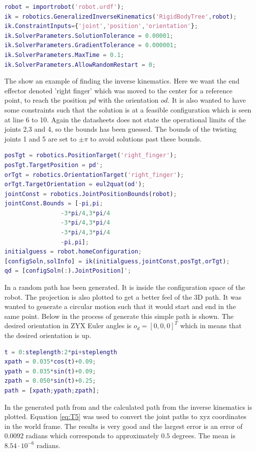 \begin{lstlisting}[caption={MATLAB code of creating a invrerse kinematics},label={lst:robotinit},language=Matlab]
robot = importrobot('robot.urdf');
ik = robotics.GeneralizedInverseKinematics('RigidBodyTree',robot);
ik.ConstraintInputs={'joint','position','orientation'};
ik.SolverParameters.SolutionTolerance = 0.00001;
ik.SolverParameters.GradientTolerance = 0.000001;
ik.SolverParameters.MaxTime = 0.1;
ik.SolverParameters.AllowRandomRestart = 0;
\end{lstlisting}

The  show an example of finding the inverse kinematics. Here we want the end effector denoted 'right finger' which was moved to the center for a reference point, to reach the position $pd$ with the orientation $od$. It is also wanted to have some constraints such that the solution is at a feasible configuration which is seen at line 6 to 10. Again the datasheets does not state the operational limits of the joints 2,3 and 4, so the bounds has been guessed. The bounds of the twisting joints 1 and 5 are set to $\pm \pi$ to avoid solutions past these bounds. 

\begin{lstlisting}[caption={MATLAB code of creating a inverse kinematics},label={lst:gik},language=Matlab]
posTgt = robotics.PositionTarget('right_finger');
posTgt.TargetPosition = pd';
orTgt = robotics.OrientationTarget('right_finger');
orTgt.TargetOrientation = eul2quat(od');
jointConst = robotics.JointPositionBounds(robot);
jointConst.Bounds = [-pi,pi;
                -3*pi/4,3*pi/4
                -3*pi/4,3*pi/4
                -3*pi/4,3*pi/4
                -pi,pi];
initialguess = robot.homeConfiguration;
[configSoln,solInfo] = ik(initialguess,jointConst,posTgt,orTgt);
qd = [configSoln(:).JointPosition]';
\end{lstlisting}

In  a random path has been generated. It is inside the configuration space of the robot. The projection is also plotted to get a better feel of the 3D path. It was wanted to generate a circular motion such that it would start and end in the same point. Below in  the process of generate this simple path is shown. The desired orientation in ZYX Euler angles is $o_d = [0,0,0]^T$ which in means that the desired orientation is up.
\begin{lstlisting}[caption={MATLAB code for creating path},label={lst:path},language=Matlab]
t = 0:steplength:2*pi+steplength
xpath = 0.035*cos(t)+0.09;
ypath = 0.035*sin(t)+0.09;
zpath = 0.050*sin(t)+0.25;
path = [xpath;ypath;zpath];
\end{lstlisting}
In  the generated path from  and the calculated path from the inverse kinematics is plotted. Equation \eqref{eq:T5} was used to convert the joint paths to xyz coordinates in the world frame. The results is very good and the largest error is an error of $0.0092$ radians which corresponds to approximately $0.5$ degrees. The mean is $8.54\cdot10^{-6}$ radians. 

